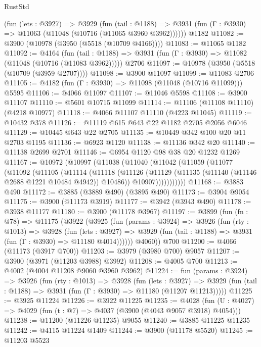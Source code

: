 \begin{lexlean}{RustStd}
\begin{coremodule}
    (fun (lets : @3927) =>
    @3929
      (fun (tail : @1188) =>
      @3931 (fun (Γ : @3930) => @11063 (@11048 (@10716 (@11065 @3960 @3962))))))
    @1182
@11082 := @3900 (@10978 (@3950 (@5518 (@10709 @4166))))
@11083 := @11065 @1182
@11092 := @4164
    (fun (tail : @1188) => @3931 (fun (Γ : @3930) => @11082 (@11048 (@10716 (@11083 @3962)))))
    @2706
@11097 := @10978 (@3950 (@5518 (@10709 (@3959 @2707))))
@11098 := @3900 @11097
@11099 := @11083 @2706
@11105 := @4182 (fun (Γ : @3930) => @11098 (@11048 (@10716 @11099))) @5595
@11106 := @4066 @11097
@11107 := @11046 @5598
@11108 := @3900 @11107
@11110 := @5601 @10715 @11099
@11114 := @11106 (@11108 @11110) (@4218 @10977)
@11118 := @4066 @11107 @11110 (@4223 @11045)
@11119 := @10432 @378
@11126 := @11119 @615 @643 @22 @1182 @2705 @2056 @6046
@11129 := @10445 @643 @22 @2705
@11135 := @10449 @342 @100 @20 @11 @2703 @1195
@11136 := @6923 @1120
@11138 := @11136 @342 @20
@11140 := @11138 @2699 @2701
@11146 := @6954 @1120 @98 @38 @20 @1232 @1269
@11167 := @10972
    (@10997
      (@11038
        (@11040
          (@11042
            (@11059
              (@11077
                (@11092
                  (@11105
                    (@11114
                      (@11118
                        (@11126
                          (@11129 (@11135 (@11140 (@11146 @2688 @1221 @10484 @4942)) @10486))
                          @10907)))))))))))
@11168 := @3883 @490
@11172 := @3885 (@3889 @490) (@3895 @490)
@11173 := @3904 @9054
@11175 := @3900 (@11173 @3919)
@11177 := @3942 (@3943 @490)
@11178 := @3938 @11177
@11180 := @3900 (@11178 @3967)
@11197 := @3899
    (fun (fn : @78) =>
    @11175
      (@3922
        (@3925
          (fun (params : @3924) =>
          @3926
            (fun (rty : @1013) =>
            @3928
              (fun (lets : @3927) =>
              @3929 (fun (tail : @1188) => @3931 (fun (Γ : @3930) => @11180 @4014))))))
        @4060))
    @700
@11200 := @4066 (@11173 (@3917 @700))
@11203 := @3979 (@3980 @700) @9057
@11207 := @3900 (@3971 (@11203 @3988) @3992)
@11208 := @4005 @700
@11213 := @4002 (@4004 @11208 @9060 @3960 @3962)
@11224 := fun (params : @3924) =>
  @3926
    (fun (rty : @1013) =>
    @3928
      (fun (lets : @3927) =>
      @3929 (fun (tail : @1188) => @3931 (fun (Γ : @3930) => @11180 (@11207 @11213)))))
@11225 := @3925 @11224
@11226 := @3922 @11225
@11235 := @4028 (fun (U : @4027) => @4029 (fun (t : @7) => @4037 (@3900 (@4043 @9057 @3918) @4054)))
@11238 := @11200 (@11226 @11235) @9055
@11240 := @3885 @11225 @11235
@11242 := @4115 @11224 @1409
@11244 := @3900 (@11178 @5520)
@11245 := @11203 @5523

\end{coremodule}
\end{lexlean}
